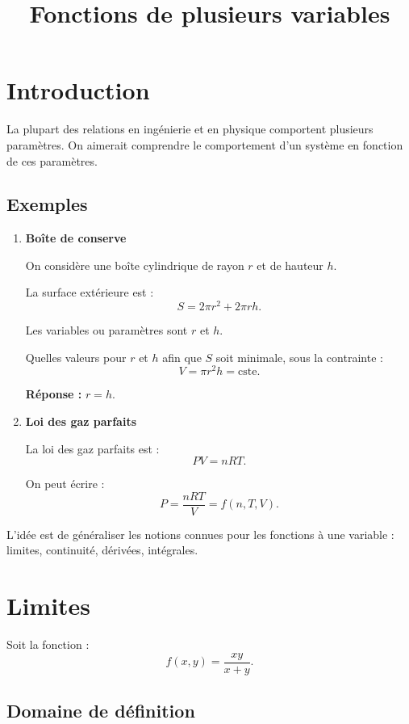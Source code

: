 \documentclass[11pt]{article}
\title{Fonctions de plusieurs variables}
\author{}
\date{}
\begin{document}
\maketitle

\section{Introduction}

La plupart des relations en ingénierie et en physique comportent plusieurs paramètres.
On aimerait comprendre le comportement d’un système en fonction de ces paramètres.

\subsection*{Exemples}

\begin{enumerate}
\item \textbf{Boîte de conserve}

On considère une boîte cylindrique de rayon $r$ et de hauteur $h$.

La surface extérieure est :
\[
S = 2\pi r^2 + 2\pi r h.
\]

Les variables ou paramètres sont $r$ et $h$.

Quelles valeurs pour $r$ et $h$ afin que $S$ soit minimale, sous la contrainte :
\[
V = \pi r^2 h = \text{cste}.
\]

\textbf{Réponse :} $r = h$.

\item \textbf{Loi des gaz parfaits}

La loi des gaz parfaits est :
\[
PV = nRT.
\]

On peut écrire :
\[
P = \frac{nRT}{V} = f(n,T,V).
\]

\end{enumerate}

L’idée est de généraliser les notions connues pour les fonctions à une variable :
limites, continuité, dérivées, intégrales.

\section{Limites}

Soit la fonction :
\[
f(x,y) = \frac{xy}{x+y}.
\]

\subsection*{Domaine de définition}
\end{document}
